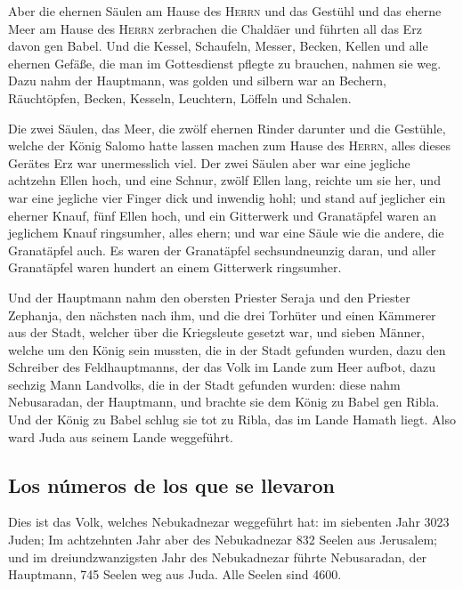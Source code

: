  Aber die ehernen Säulen am Hause des \textsc{Herrn} und
das Gestühl und das eherne Meer am Hause des \textsc{Herrn} zerbrachen
die Chaldäer und führten all das Erz davon gen Babel. 
Und die Kessel, Schaufeln, Messer, Becken, Kellen und alle ehernen
Gefäße, die man im Gottesdienst pflegte zu brauchen, nahmen sie weg.
 Dazu nahm der Hauptmann, was golden und silbern war an
Bechern, Räuchtöpfen, Becken, Kesseln, Leuchtern, Löffeln und Schalen.

 Die zwei Säulen, das Meer, die zwölf ehernen Rinder
darunter und die Gestühle, welche der König Salomo hatte lassen machen
zum Hause des \textsc{Herrn}, alles dieses Gerätes Erz war unermesslich
viel.  Der zwei Säulen aber war eine jegliche achtzehn
Ellen hoch, und eine Schnur, zwölf Ellen lang, reichte um sie her, und
war eine jegliche vier Finger dick und inwendig hohl; 
und stand auf jeglicher ein eherner Knauf, fünf Ellen hoch, und ein
Gitterwerk und Granatäpfel waren an jeglichem Knauf ringsumher, alles
ehern; und war eine Säule wie die andere, die Granatäpfel auch.
 Es waren der Granatäpfel sechsundneunzig daran, und
aller Granatäpfel waren hundert an einem Gitterwerk ringsumher.

 Und der Hauptmann nahm den obersten Priester Seraja und
den Priester Zephanja, den nächsten nach ihm, und die drei Torhüter
 und einen Kämmerer aus der Stadt, welcher über die
Kriegsleute gesetzt war, und sieben Männer, welche um den König sein
mussten, die in der Stadt gefunden wurden, dazu den Schreiber des
Feldhauptmanns, der das Volk im Lande zum Heer aufbot, dazu sechzig Mann
Landvolks, die in der Stadt gefunden wurden:  diese nahm
Nebusaradan, der Hauptmann, und brachte sie dem König zu Babel gen
Ribla.  Und der König zu Babel schlug sie tot zu Ribla,
das im Lande Hamath liegt. Also ward Juda aus seinem Lande weggeführt.

\hypertarget{los-nuxfameros-de-los-que-se-llevaron}{%
\subsection{Los números de los que se
llevaron}\label{los-nuxfameros-de-los-que-se-llevaron}}

 Dies ist das Volk, welches Nebukadnezar weggeführt hat:
im siebenten Jahr 3023 Juden;  Im achtzehnten Jahr aber
des Nebukadnezar 832 Seelen aus Jerusalem;  und im
dreiundzwanzigsten Jahr des Nebukadnezar führte Nebusaradan, der
Hauptmann, 745 Seelen weg aus Juda. Alle Seelen sind 4600.

